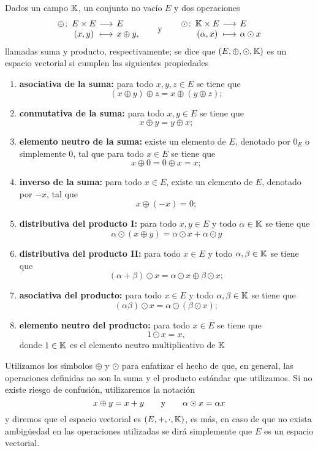 \documentclass[a4,11pt]{aleph-notas}
\begin{document}
\begin{defi}
    Dados un campo $\mathbb{K}$, un conjunto no vacío $E$ y dos operaciones
    \[
        \funcion{\oplus}{E\times E}{E}{(x,y)}{x\oplus y,}
        \texty
        \funcion{\odot}{\K\times E}{E}{(\alpha,x)}{\alpha\odot x}
    \]
    llamadas suma y producto, respectivamente; se dice que $(E,\oplus,\odot,\mathbb{K})$ es un espacio vectorial si cumplen las siguientes propiedades
    \begin{enumerate}
    \item \textbf{asociativa de la suma:}
        para todo $x,y,z\in E$ se tiene que
        \[
            (x \oplus y) \oplus z = x \oplus (y \oplus z);
        \]
    \item \textbf{conmutativa de la suma:}
        para todo $x,y\in E$ se tiene que
        \[
            x \oplus y = y \oplus x;
        \]
    \item \textbf{elemento neutro de la suma:}
        existe un elemento de $E$, denotado por $0_E$ o simplemente $0$, tal que para todo $x\in E$ se tiene que 
        \[
            x \oplus 0 = 0 \oplus x = x;
        \]
    \item \textbf{inverso de la suma:}
        para todo $x\in E$, existe un elemento de $E$, denotado por $-x$, tal que
        \[
            x \oplus (-x)= 0;
        \]
    \item \textbf{distributiva del producto I:}
        para todo $x,y\in E$ y todo $\alpha\in \mathbb{K}$ se tiene que
        \[
            \alpha\odot (x \oplus y)=\alpha\odot x + \alpha\odot y
        \]
    \item \textbf{distributiva del producto II:}
        para todo $x\in E$ y todo $\alpha,\beta\in \mathbb{K}$ se tiene que
        \[
            (\alpha+\beta)\odot x=\alpha\odot x \oplus \beta\odot x;
        \]
    \item \textbf{asociativa del producto:}
        para todo $x\in E$ y todo $\alpha,\beta\in \mathbb{K}$ se tiene que
        \[
            (\alpha\beta)\odot x=\alpha\odot(\beta\odot x);
        \]
    \item \textbf{elemento neutro del producto:}
        para todo $x\in E$ se tiene que
        \[
            1\odot x=x,
        \]
        donde $1\in\mathbb{K}$ es el elemento neutro multiplicativo de $\mathbb{K}$
    \end{enumerate}
\end{defi}

\begin{advertencia}
    Utilizamos los símbolos $\oplus$ y $\odot$ para enfatizar el hecho de que, en general, las operaciones definidas no son la suma y el producto estándar que utilizamos. Si no existe riesgo de confusión, utilizaremos la notación
    \[
        x\oplus y = x+y
        \qquad\text{y}\qquad
        \alpha \odot x = \alpha x
    \]
    y diremos que el espacio vectorial es $(E,+,\cdot,\mathbb{K})$, es más, en caso de que no exista ambigüedad en las operaciones utilizadas se dirá simplemente que $E$ es un espacio vectorial.
\end{advertencia}
\end{document}
